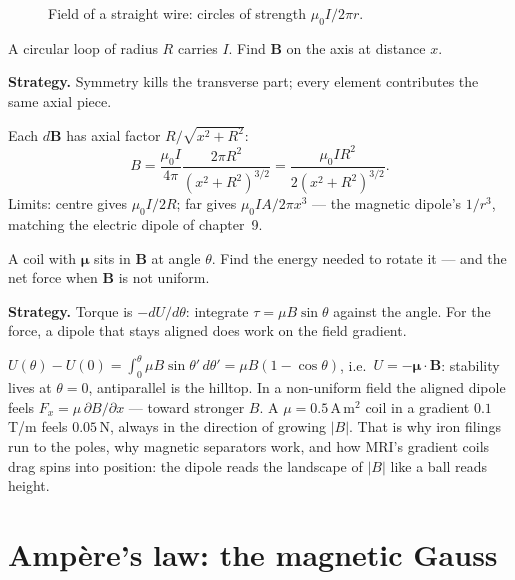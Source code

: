 \begin{figure}[htbp]\centering

\caption{Field of a straight wire: circles of strength
$\mu_0I/2\pi r$.}
\label{fig:wire}
\end{figure}

\begin{example}\label{ex:loopaxis}
A circular loop of radius $R$ carries $I$. Find $\mathbf B$ on the
axis at distance $x$.
\par\smallskip
\textbf{Strategy.} Symmetry kills the transverse part; every element
contributes the same axial piece.
\begin{solution}
Each $d\mathbf B$ has axial factor $R/\sqrt{x^{2}+R^{2}}$:
\[B=\frac{\mu_0I}{4\pi}\frac{2\pi R^{2}}{(x^{2}+R^{2})^{3/2}}
=\frac{\mu_0IR^{2}}{2(x^{2}+R^{2})^{3/2}}.\]
Limits: centre gives $\mu_0I/2R$; far gives $\mu_0IA/2\pi x^{3}$
--- the magnetic dipole's $1/r^{3}$, matching the electric dipole of
chapter~9. \checkmark
\end{solution}
\end{example}

\begin{example}\label{ex:dipen}
A coil with $\boldsymbol\mu$ sits in $\mathbf B$ at angle $\theta$.
Find the energy needed to rotate it --- and the net force when
$\mathbf B$ is not uniform.
\par\smallskip
\textbf{Strategy.} Torque is $-dU/d\theta$: integrate
$\tau=\mu B\sin\theta$ against the angle. For the force, a dipole
that stays aligned does work on the field gradient.
\begin{solution}
$U(\theta)-U(0)=\int_0^{\theta}\mu B\sin\theta'\,d\theta'
=\mu B(1-\cos\theta)$, i.e.\ $U=-\boldsymbol\mu\cdot\mathbf B$:
stability lives at $\theta=0$, antiparallel is the hilltop. In a
non-uniform field the aligned dipole feels
$F_x=\mu\,\partial B/\partial x$ --- toward stronger $B$. A
$\mu=0.5$\,A\,m$^{2}$ coil in a gradient $0.1$\,T/m feels
$0.05$\,N, always in the direction of growing $|B|$. That is why
iron filings run to the poles, why magnetic separators work, and how
MRI's gradient coils drag spins into position: the dipole reads the
landscape of $|B|$ like a ball reads height. \checkmark
\end{solution}
\end{example}

\section{Amp\`ere's law: the magnetic Gauss}\label{sec:mag-amp}


